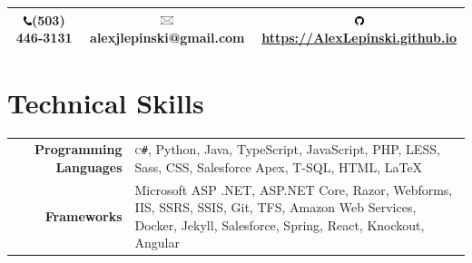 \documentclass[10pt]{article}
\newcommand{\phoneicon}{\includegraphics[height=2.5mm,keepaspectratio]{phone.png}}
\newcommand{\emailicon}{\includegraphics[height=2.4mm,keepaspectratio]{emailicon.jpg}}
\newcommand{\githubicon}{\includegraphics[height=2.6mm,keepaspectratio]{githubicon.png}}
\begin{document}
\pagestyle{empty} %

\par{\par}

\begin{center}{\def\arraystretch{1.5}
\begin{tabular}{ccc}
    \hline\hline
    \phoneicon  \space (503) 446-3131 &
    \emailicon  \space alexjlepinski@gmail.com &
    \githubicon \space \url{https://AlexLepinski.github.io}\\
	\hline\hline
\end{tabular}
}\end{center}

\vspace*{-\baselineskip}
\vspace{3mm}


\vspace*{-\baselineskip}
\vspace{3mm}

\section{Technical Skills}

\begin{tabular}{rp{13.1cm}}
\textbf{\space Programming Languages}
	&  \textsc{c\texttt{\#}}, Python,
    Java, TypeScript, JavaScript, PHP, LESS, Sass, CSS,
  		Salesforce Apex, T-SQL, HTML, \LaTeX\\
\textbf{\space Frameworks}
	& Microsoft ASP .NET, ASP.NET Core, Razor, Webforms, IIS, SSRS, SSIS, Git, TFS, Amazon Web Services, Docker, Jekyll, Salesforce, Spring, React, Knockout, Angular \\
\end{tabular}
\vspace*{-\baselineskip}
\vspace{3mm}

\vspace*{-\baselineskip}
\vspace{3mm}
\end{document}
